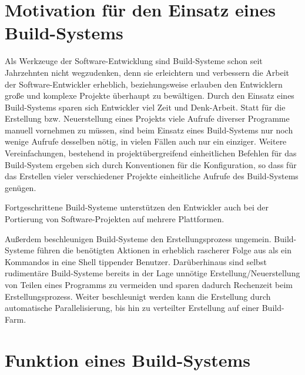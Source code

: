 \section{Motivation für den Einsatz eines Build-Systems} 

Als Werkzeuge der Software-Entwicklung sind Build-Systeme schon seit Jahrzehnten
nicht wegzudenken, denn sie erleichtern und verbessern die Arbeit der
Software-Entwickler erheblich, beziehungsweise erlauben den Entwicklern große
und komplexe Projekte überhaupt zu bewältigen. 
%
Durch den Einsatz eines Build-Systems sparen sich Entwickler viel Zeit und
Denk-Arbeit. Statt für die Erstellung bzw. Neuerstellung eines Projekts viele
Aufrufe diverser Programme manuell vornehmen zu müssen, sind beim Einsatz eines
Build-Systems nur noch wenige Aufrufe desselben nötig, in vielen Fällen auch
nur ein einziger.
%
Weitere Vereinfachungen, bestehend in projektübergreifend einheitlichen Befehlen
für das Build-System ergeben sich durch Konventionen für die Konfiguration, so
dass für das Erstellen vieler verschiedener Projekte einheitliche Aufrufe des
Build-Systems genügen.

Fortgeschrittene Build-Systeme unterstützen den Entwickler auch bei der
Portierung von Software-Projekten auf mehrere Plattformen. %

Außerdem beschleunigen Build-Systeme den Erstellungsprozess ungemein.
Build-Systeme führen die benötigten Aktionen in erheblich rascherer Folge aus
als ein Kommandos in eine Shell tippender Benutzer. 
%
Darüberhinaus sind selbst rudimentäre Build-Systeme bereits in der Lage unnötige
Erstellung/Neuerstellung von Teilen eines Programms zu vermeiden und sparen
dadurch Rechenzeit beim Erstellungsprozess.
%
Weiter beschleunigt werden kann die Erstellung durch automatische
Parallelisierung, bis hin zu verteilter Erstellung auf einer Build-Farm.

\section{Funktion eines Build-Systems}
